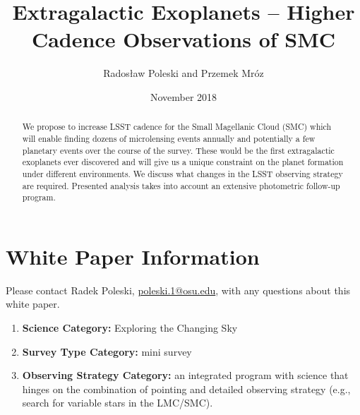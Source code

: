 \documentclass[12pt,letterpaper]{article}
\title{Extragalactic Exoplanets -- Higher Cadence Observations of SMC}
\author{Rados\l{}aw Poleski and Przemek Mr\'oz}
\date{November 2018}
\begin{document}
\maketitle

\begin{abstract}
We propose to increase LSST cadence for the Small Magellanic Cloud (SMC) which will 
enable finding dozens of microlensing events annually and potentially a few 
planetary events over the course of the survey.  These would be 
the first extragalactic exoplanets ever discovered and will give us a unique constraint on 
the planet formation under different environments.  We discuss what changes in 
the LSST observing strategy are required.  Presented analysis takes into account 
an extensive photometric follow-up program. 
\end{abstract}

\section{White Paper Information}
Please contact Radek Poleski, \url{poleski.1@osu.edu}, with any questions about this white paper.  %
\begin{enumerate} 
\item {\bf Science Category:} Exploring the Changing Sky
% 
\item {\bf Survey Type Category:} mini survey
\item {\bf Observing Strategy Category:} %
      an integrated program with science that hinges on the combination of pointing and detailed 
	observing strategy (e.g., search for variable stars in the 
	LMC/SMC). 
\end{enumerate}  
\end{document}
